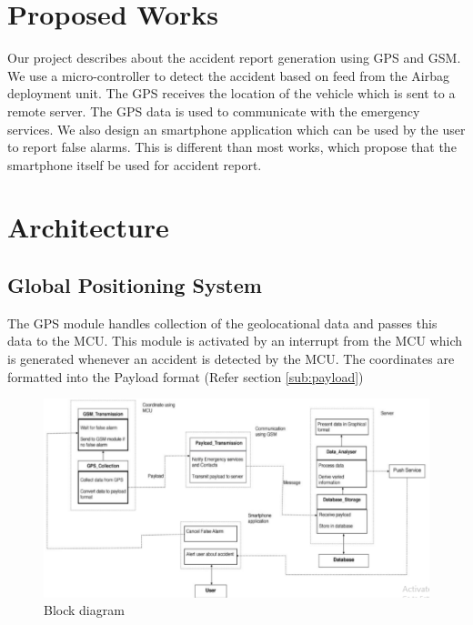 \documentclass{llncs}
\begin{document}
\section{Proposed Works}

Our project describes about the accident report generation using GPS and GSM. We use a micro-controller to detect the accident based on feed from the Airbag deployment unit. The GPS receives the location of the vehicle which is sent to a remote server. The GPS data is used to communicate with the emergency services. We also design an smartphone application which can be used by the user to report false alarms. This is different than most works, which propose that the smartphone itself be used for accident report. 

\section{Architecture}


\subsection{Global Positioning System}

The GPS module handles collection of the geolocational data and passes this data to the MCU. This module is activated by an interrupt from the MCU which is generated whenever an accident is detected by the MCU. The coordinates are formatted into the Payload format (Refer section \ref{sub:payload}) \\


\begin{figure}[h!]
\centering
\includegraphics[scale=0.5]{block}
\caption{Block diagram}
\label{fig:block}
\end{figure}
\end{document}
